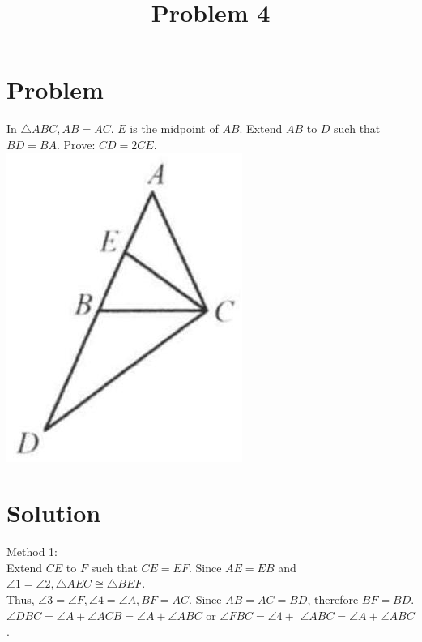 \documentclass{article}
\title{Problem 4}
\date{}
\begin{document}
\maketitle

\section*{Problem}
In \(\triangle A B C, A B=A C\). \(E\) is the midpoint of \(A B\). Extend \(A B\) to \(D\) such that \(B D=B A\). Prove: \(C D=2 C E\).\\
\centering
\includegraphics[width=\textwidth]{images/027(1).jpg}

\section*{Solution}
Method 1:\\
Extend \(C E\) to \(F\) such that \(C E=E F\). Since \(A E=E B\) and \(\angle 1=\angle 2, \triangle A E C \cong \triangle B E F\).\\
Thus, \(\angle 3=\angle F, \angle 4=\angle A, B F=A C\). Since \(A B=A C=B D\), therefore \(B F=B D\). \(\angle D B C=\angle A+\angle A C B=\angle A+\angle A B C\) or \(\angle F B C=\angle 4+\) \(\angle A B C=\angle A+\angle A B C\).
\end{document}
